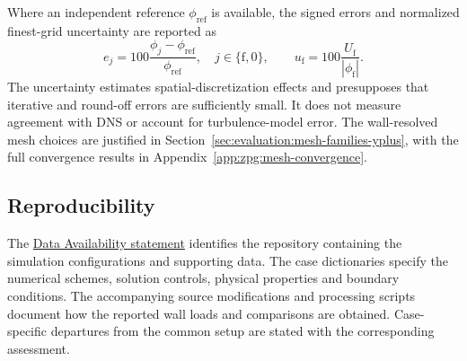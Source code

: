 Where an independent reference \(\phi_{\mathrm{ref}}\) is available, the
signed errors and normalized finest-grid uncertainty are reported as
\begin{equation}
    e_j=100\frac{\phi_j-\phi_{\mathrm{ref}}}{\phi_{\mathrm{ref}}},
    \quad j\in\{\mathrm f,0\},
    \qquad
    u_{\mathrm f}=100\frac{U_{\mathrm f}}{|\phi_{\mathrm f}|}.
    \label{eq:numerical-framework:error-uncertainty}
\end{equation}
The uncertainty estimates spatial-discretization effects and presupposes
that iterative and round-off errors are sufficiently small. It does not
measure agreement with DNS or account for turbulence-model error.
The wall-resolved mesh choices are justified in
Section~\ref{sec:evaluation:mesh-families-yplus}, with the full convergence
results in Appendix~\ref{app:zpg:mesh-convergence}.

\subsection{Reproducibility}

The \hyperref[chap:data-avail]{Data Availability statement} identifies the
repository containing the simulation configurations and supporting data.
The case dictionaries specify the numerical schemes, solution controls,
physical properties and boundary conditions. The accompanying source
modifications and processing scripts document how the reported wall loads
and comparisons are obtained. Case-specific departures from the common
setup are stated with the corresponding assessment.
